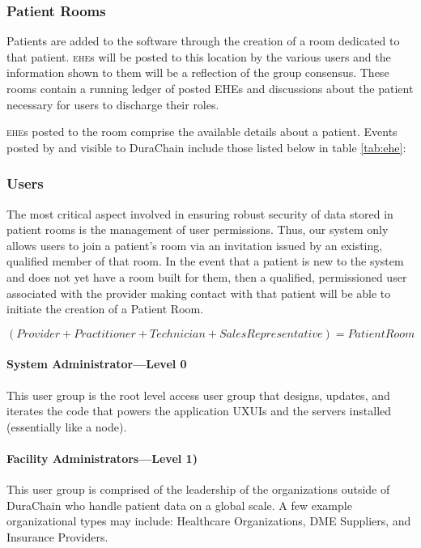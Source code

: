   \subsubsection{Patient Rooms}
  Patients are added to the software through the creation of a room dedicated to that patient. \textsc{ehe}s will be posted to this location by the various users and the information shown to them will be a reflection of the group consensus. These rooms contain a running ledger of posted EHEs and discussions about the patient necessary for users to discharge their roles.%

  \textsc{ehe}s posted to the room comprise the available details about a patient. Events posted by and visible to DuraChain include those listed below in table \ref{tab:ehe}:%



  \subsubsection{Users}
  The most critical aspect involved in ensuring robust security of data stored in patient rooms is the management of user permissions. Thus, our system only allows users to join a patient's room via an invitation issued by an existing, qualified member of that room. In the event that a patient is new to the system and does not yet have a room built for them, then a qualified, permissioned user associated with the provider making contact with that patient will be able to initiate the creation of a Patient Room.%

  $( Provider + Practitioner + Technician + Sales Representative ) = Patient Room $

  \paragraph{System Administrator---Level 0}
  This user group is the root level access user group that designs, updates, and iterates the code that powers the application UXUIs and the servers installed (essentially like a node).

  \paragraph{Facility Administrators---Level 1)}
  This user group is comprised of the leadership of the organizations outside of DuraChain who handle patient data on a global scale. A few example organizational types may include: Healthcare Organizations, DME Suppliers, and Insurance Providers.

